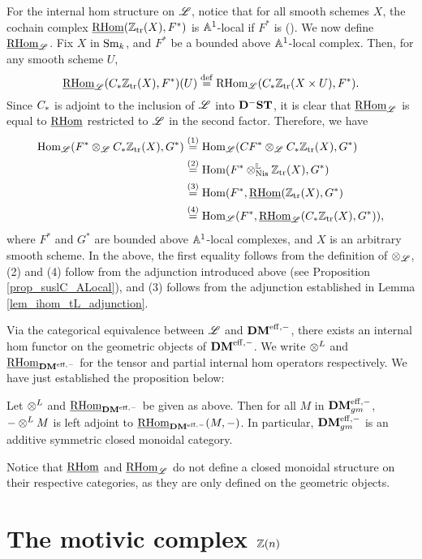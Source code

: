 For the internal hom structure on $\ALocal$, notice that for all
smooth schemes $X$, the cochain complex $\sheaf{\rhom}(\Ztr(X), F^*)$ is $\A^1$-local if 
$F^*$ is (\cite[14.12]{MVW}). We now define $\ihomAL$. Fix $X$ in
$\Sm$, and $F^*$ be a bounded above $\A^1$-local complex. Then, for
any smooth scheme $U$,
\[
\ihomAL(\suslC \Ztr(X), F^*)(U) \defeq \rhom_{\ALocal}(\suslC 
   \Ztr(X \times U), F^*).
\]
Since $\suslC$ is adjoint to the inclusion of $\ALocal$ into 
$\DShCor$, it is clear that $\ihomAL$ is equal to $\sheaf{\rhom}$
restricted to $\ALocal$ in the second factor. Therefore, we have
\begin{align*}
\hom_{\ALocal}(F^* \tAL \suslC \Ztr(X), G^*) &\stackrel{(1)}{=}
\hom_{\ALocal}(\suslC[] F^* \tAL \suslC \Ztr(X), G^*) \\ 
&\stackrel{(2)}{=} \hom(F^* \tLNis \Ztr(X), G^*) \\
&\stackrel{(3)}{=} \hom(F^*, \sheaf{\rhom}(\Ztr(X), G^*) \\
&\stackrel{(4)}{=} \hom_{\ALocal}(F^*, \ihomAL(\suslC \Ztr(X), G^*)),
\end{align*}
where $F^*$ and $G^*$ are bounded above $\A^1$-local complexes,
and $X$ is an arbitrary smooth scheme. In the above, the first 
equality follows from the definition of $\tAL$, (2) and (4) 
follow from the adjunction introduced above (see Proposition
\ref{prop_suslC_ALocal}), and (3) follows from the adjunction
established in Lemma \ref{lem_ihom_tL_adjunction}. 

Via the categorical equivalence between $\ALocal$ and $\DMeff$,
there exists an internal hom functor on the geometric objects
of $\DMeff$. We write $\tDM$ and $\ihomDMf$ for the tensor and
partial internal hom operators respectively. We have just
established the proposition below:

\begin{prop}\label{prop_DMgm_monoidal}
Let $\tDM$ and $\ihomDMf$ be given as above. Then for all
$M$ in $\DMeffgm$, $- \tDM M$ is left adjoint to $\ihomDMf(M, -)$.
In particular, $\DMeffgm$ is an additive symmetric closed monoidal 
category.
\end{prop}

\begin{rmk}\label{rmk_partial_ihom}
Notice that $\sheaf{\rhom}$ and $\ihomAL$ do not define a closed
monoidal structure on their respective categories, as they are only
defined on the geometric objects.
\end{rmk}

\section{The motivic complex $\Z(n)$}
\label{sect_motivic_complex}

